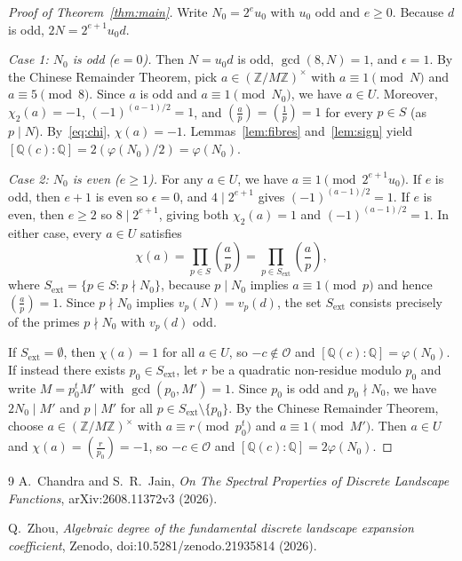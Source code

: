 \documentclass[11pt]{article}
\begin{document}
\begin{proof}[Proof of Theorem~\ref{thm:main}]
Write $N_0 = 2^e u_0$ with $u_0$ odd and $e \ge 0$. Because $d$ is odd, $2N = 2^{e+1} u_0 d$.

\emph{Case 1: $N_0$ is odd ($e = 0$).} Then $N = u_0 d$ is odd, $\gcd(8, N) = 1$, and $\epsilon = 1$. By the Chinese Remainder Theorem, pick $a \in (\mathbb{Z}/M\mathbb{Z})^\times$ with $a \equiv 1 \pmod N$ and $a \equiv 5 \pmod 8$. Since $a$ is odd and $a \equiv 1 \pmod{N_0}$, we have $a \in U$. Moreover, $\chi_2(a) = -1$, $(-1)^{(a-1)/2} = 1$, and $\left(\frac{a}{p}\right) = \left(\frac{1}{p}\right) = 1$ for every $p \in S$ (as $p \mid N$). By~\eqref{eq:chi}, $\chi(a) = -1$. Lemmas~\ref{lem:fibres} and~\ref{lem:sign} yield $[\mathbb{Q}(c) : \mathbb{Q}] = 2(\varphi(N_0)/2) = \varphi(N_0)$.

\emph{Case 2: $N_0$ is even ($e \ge 1$).} For any $a \in U$, we have $a \equiv 1 \pmod{2^{e+1} u_0}$. If $e$ is odd, then $e + 1$ is even so $\epsilon = 0$, and $4 \mid 2^{e+1}$ gives $(-1)^{(a-1)/2} = 1$. If $e$ is even, then $e \ge 2$ so $8 \mid 2^{e+1}$, giving both $\chi_2(a) = 1$ and $(-1)^{(a-1)/2} = 1$. In either case, every $a \in U$ satisfies
\[
\chi(a) = \prod_{p \in S} \left(\frac{a}{p}\right) = \prod_{p \in S_{\mathrm{ext}}} \left(\frac{a}{p}\right),
\]
where $S_{\mathrm{ext}} = \{p \in S : p \nmid N_0\}$, because $p \mid N_0$ implies $a \equiv 1 \pmod p$ and hence $\left(\frac{a}{p}\right) = 1$. Since $p \nmid N_0$ implies $v_p(N) = v_p(d)$, the set $S_{\mathrm{ext}}$ consists precisely of the primes $p \nmid N_0$ with $v_p(d)$ odd.

If $S_{\mathrm{ext}} = \emptyset$, then $\chi(a) = 1$ for all $a \in U$, so $-c \notin \mathcal{O}$ and $[\mathbb{Q}(c) : \mathbb{Q}] = \varphi(N_0)$. If instead there exists $p_0 \in S_{\mathrm{ext}}$, let $r$ be a quadratic non-residue modulo $p_0$ and write $M = p_0^t M'$ with $\gcd(p_0, M') = 1$. Since $p_0$ is odd and $p_0 \nmid N_0$, we have $2N_0 \mid M'$ and $p \mid M'$ for all $p \in S_{\mathrm{ext}} \setminus \{p_0\}$. By the Chinese Remainder Theorem, choose $a \in (\mathbb{Z}/M\mathbb{Z})^\times$ with $a \equiv r \pmod{p_0^t}$ and $a \equiv 1 \pmod{M'}$. Then $a \in U$ and $\chi(a) = \left(\frac{r}{p_0}\right) = -1$, so $-c \in \mathcal{O}$ and $[\mathbb{Q}(c) : \mathbb{Q}] = 2\varphi(N_0)$.
\end{proof}

\begin{thebibliography}{9}
A.~Chandra and S.~R.~Jain,
\emph{On The Spectral Properties of Discrete Landscape Functions},
arXiv:2608.11372v3 (2026).

Q.~Zhou,
\emph{Algebraic degree of the fundamental discrete landscape expansion coefficient},
Zenodo, doi:10.5281/zenodo.21935814 (2026).
\end{thebibliography}
\end{document}
